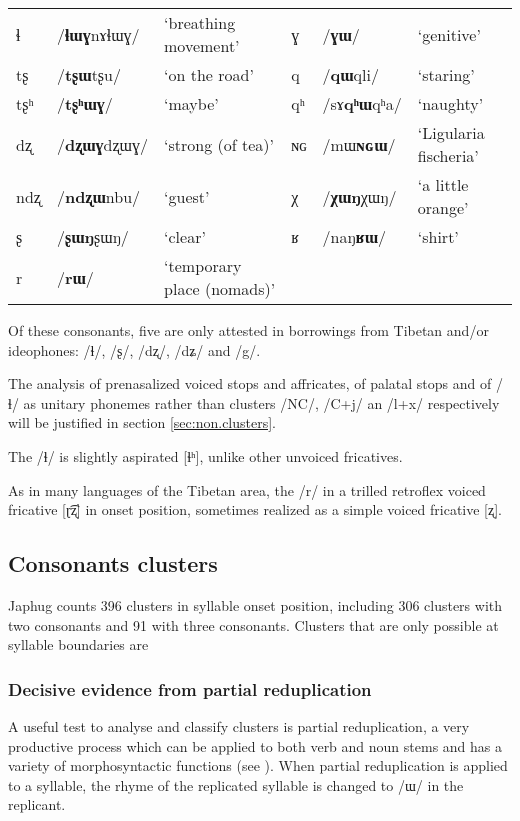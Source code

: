 \documentclass[oldfontcommands,oneside,a4paper,11pt]{article}
\newcommand{\ipa}[1]{/#1/} %
\begin{document}
\begin{table}
{\begin{tabular}{lll|lll}
ɬ   & 	  \ipa{\textbf{ɬɯɣ}nɤɬɯɣ}   & 	 `breathing movement' & 	ɣ & 	\ipa{\textbf{ɣɯ}}   & 	 `genitive' \\ 
tʂ   & 	  \ipa{\textbf{tʂɯ}tʂu}   & 	 `on the road' & 	q & 	\ipa{\textbf{qɯ}qli}   & 	 `staring' \\ 
tʂʰ   & 	  \ipa{\textbf{tʂʰɯɣ}}   & 	 `maybe' & 	qʰ & 	\ipa{sɤ\textbf{qʰɯ}qʰa}   & 	 `naughty' \\ 
dʐ   & 	\ipa{\textbf{dʐɯɣ}dʐɯɣ}   & 	 `strong (of tea)' & 	ɴɢ & 	\ipa{mɯ\textbf{ɴɢɯ}}  & 	 `Ligularia fischeria' \\ 
ndʐ & 	\ipa{\textbf{ndʐɯ}nbu}   & 	 `guest' & 	χ & 	\ipa{\textbf{χɯŋ}χɯŋ}   & 	 `a little orange' \\ 
ʂ & 	\ipa{\textbf{ʂɯŋ}ʂɯŋ}   & 	 `clear' & 	ʁ & 	\ipa{naŋ\textbf{ʁɯ}}   & 	 `shirt' \\ 
r & 	\ipa{\textbf{rɯ}}   & 	 `temporary place (nomads)' & 	  & 	 & 	 \\ 
\bottomrule
\end{tabular}}
\end{table}

Of these consonants, five are only attested in borrowings from Tibetan and/or ideophones: /ɬ/, /ʂ/, /dʐ/, /dʑ/ and /g/.

The analysis of prenasalized voiced stops and affricates, of palatal stops and of /ɬ/ as unitary phonemes rather than clusters /NC/, /C+j/ an /l+x/ respectively will be justified in section \ref{sec:non.clusters}. 

The /ɬ/ is slightly aspirated [ɬʰ], unlike other unvoiced fricatives.


As in many languages of the Tibetan area, the /r/ in a trilled retroflex voiced fricative [ɽ͡ʐ] in onset position, sometimes realized as a simple voiced fricative [ʐ].


  \subsection{Consonants clusters} \label{sec:clusters}
  Japhug counts 396 clusters in syllable onset position, including  306 clusters with two consonants and 91 with three consonants. Clusters that are only possible at syllable boundaries are
  
  \subsubsection{Decisive evidence from partial reduplication} \label{sec:redp}
 A useful test to analyse and classify clusters is partial reduplication, a very productive process which can be applied to both verb and noun stems and has a variety of morphosyntactic functions (see \citealt{jacques07redupl}). When partial reduplication is applied to a syllable, the rhyme of the replicated syllable is changed to \ipa{ɯ} in the replicant.
 
\end{document}
